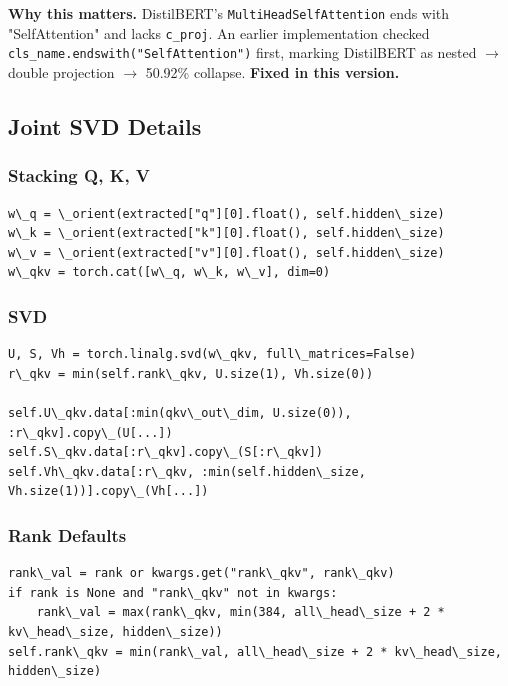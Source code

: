 \textbf{Why this matters.} DistilBERT's \texttt{MultiHeadSelfAttention} ends with 
"SelfAttention" and lacks \texttt{c\_proj}. An earlier implementation checked 
\texttt{cls\_name.endswith("SelfAttention")} first, marking DistilBERT as nested $\to$ 
double projection $\to$ 50.92\% collapse. \textbf{Fixed in this version.}

\subsection{Joint SVD Details}

\subsubsection{Stacking Q, K, V}

\begin{lstlisting}
w\_q = \_orient(extracted["q"][0].float(), self.hidden\_size)
w\_k = \_orient(extracted["k"][0].float(), self.hidden\_size)
w\_v = \_orient(extracted["v"][0].float(), self.hidden\_size)
w\_qkv = torch.cat([w\_q, w\_k, w\_v], dim=0)
\end{lstlisting}

\subsubsection{SVD}

\begin{lstlisting}
U, S, Vh = torch.linalg.svd(w\_qkv, full\_matrices=False)
r\_qkv = min(self.rank\_qkv, U.size(1), Vh.size(0))

self.U\_qkv.data[:min(qkv\_out\_dim, U.size(0)), :r\_qkv].copy\_(U[...])
self.S\_qkv.data[:r\_qkv].copy\_(S[:r\_qkv])
self.Vh\_qkv.data[:r\_qkv, :min(self.hidden\_size, Vh.size(1))].copy\_(Vh[...])
\end{lstlisting}

\subsubsection{Rank Defaults}

\begin{lstlisting}
rank\_val = rank or kwargs.get("rank\_qkv", rank\_qkv)
if rank is None and "rank\_qkv" not in kwargs:
    rank\_val = max(rank\_qkv, min(384, all\_head\_size + 2 * kv\_head\_size, hidden\_size))
self.rank\_qkv = min(rank\_val, all\_head\_size + 2 * kv\_head\_size, hidden\_size)
\end{lstlisting}

